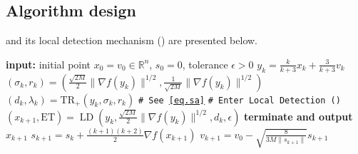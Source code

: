 \documentclass{mcom-l}
\newcommand{\trp}{\textrm{TR}_+}
\numberwithin{equation}{section}
\begin{document}
\subsection{Algorithm design}
 and its local detection mechanism () are presented below.
\begin{algorithm}[ht]
    \caption{Global-Local Accelerated Trust-Region Method (\atr{})}\label{alg.accelerated utr}
    \begin{algorithmic}[1]
        \STATE \textbf{input:} initial point $x_0=v_0\in \mathbb{R}^n$, $s_0=0$, tolerance $\epsilon>0$
        \STATE $y_k = \frac{k}{k+3}x_k+\frac{3}{k+3}v_k$
        \STATE $(\sigma_k,r_k) = (\tfrac{\sqrt{2M}}{2}\|\nabla f(y_k)\|^{1/2},\tfrac{1}{\sqrt{2M}}\|\nabla f(y_k)\|^{1/2})$
        \STATE $(d_k,\lambda_k) = \trp(y_k,\sigma_k,r_k)$ \hfill\texttt{\# See \eqref{eq.sa}}
         \label{line.if}
        \STATE \texttt{\# Enter Local Detection ()}
        \STATE $(x_{k+1},\text{ET}) = \operatorname{LD}(y_k,\tfrac{\sqrt{2M}}{2}\|\nabla f(y_k)\|^{1/2},d_k,\epsilon)$
        \label{line.early terminate main}
        \STATE \textbf{terminate and output $x_{k+1}$}
        \ENDIF
        \ENDIF
        \STATE $s_{k+1} = s_{k}+\tfrac{(k+1)(k+2)}{2}\nabla f(x_{k+1})$
        \STATE $v_{k+1} = v_0-\sqrt{\tfrac{8}{3M\|s_{k+1}\|}}s_{k+1}$
        \ENDFOR
    \end{algorithmic}
\end{algorithm}
\end{document}
